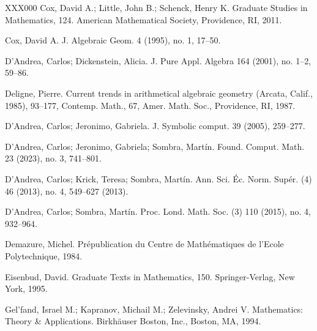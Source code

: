 \documentclass[a4paper,11pt]{amsart}
\newcounter{thm}
\numberwithin{thm}{section}
\numberwithin{equation}{section}
\theoremstyle{definition}
\theoremstyle{plain}
\begin{document}
\begin{thebibliography}{XXX000}
Cox, David A.; Little, John B.; Schenck, Henry K.
 Graduate Studies in Mathematics, 124.
\newblock American Mathematical Society, Providence, RI, 2011.

Cox, David A.
\newblock J. Algebraic Geom. 4 (1995), no. 1, 17--50.


D'Andrea, Carlos; Dickenstein, Alicia.
\newblock J. Pure Appl. Algebra 164 (2001), no. 1--2, 59--86.

Deligne, Pierre.
\newblock  Current trends in arithmetical algebraic geometry (Arcata, Calif., 1985), 93--177,
Contemp. Math., 67, Amer. Math. Soc., Providence, RI, 1987.

D'Andrea, Carlos; Jeronimo, Gabriela.
\newblock J. Symbolic comput. 39 (2005), 259--277.

D'Andrea, Carlos; Jeronimo, Gabriela; Sombra, Mart\'in.
\newblock Found. Comput. Math. 23 (2023), no. 3, 741--801.

D'Andrea, Carlos; Krick, Teresa; Sombra, Mart\'in.
\newblock Ann. Sci. \'Ec. Norm. Sup\'er. (4) 46 (2013), no. 4, 549--627 (2013).

D'Andrea, Carlos; Sombra, Mart\'in.
Proc. Lond. Math. Soc. (3) 110 (2015), no. 4, 932--964.


Demazure, Michel.
\newblock Pr\'epublication du Centre de Math\'ematiques de l'Ecole Polytechnique, 1984.


Eisenbud, David.
\newblock Graduate Texts in Mathematics, 150. Springer-Verlag, New York, 1995.

Gel'fand, Israel M.; Kapranov, Michail M.; Zelevinsky, Andrei V.
\newblock Mathematics: Theory \& Applications. Birkh\"auser Boston, Inc., Boston, MA, 1994.



\end{thebibliography}
\end{document}
